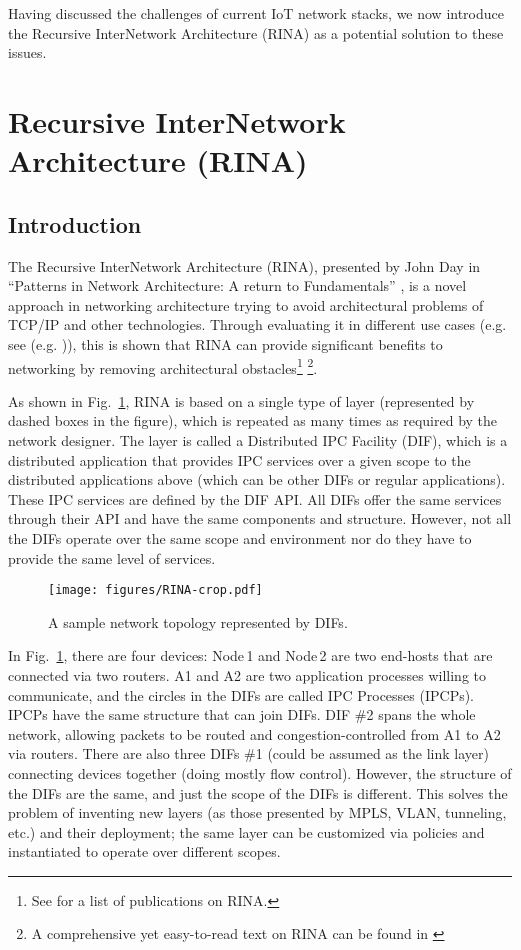 \documentclass{ieeeaccess}
\begin{document}
Having discussed the challenges of current IoT network stacks, we now introduce the Recursive InterNetwork Architecture (RINA) as a potential solution to these issues.


\section{Recursive InterNetwork Architecture (RINA)}
\label{sec:rina}
\subsection{Introduction}

The Recursive InterNetwork Architecture (RINA), presented by John Day in ``Patterns in Network Architecture: A return to Fundamentals'' \cite{Day:2008:PNA}, is a novel approach in networking architecture trying to avoid architectural problems of TCP/IP and other technologies. Through evaluating it in different use cases (e.g. see (e.g. \cite{peymanICC16,boddapati2012assessing,day2008networking,7510780,leon2016benefits,small2012})), this is shown that RINA can provide significant benefits to networking by removing architectural obstacles\footnote{See \cite{pouzinsociety} for a list of publications on RINA.} \footnote{A comprehensive yet easy-to-read text on RINA can be found in \cite{NGP2019}}. 


As shown in Fig.~\ref{fig:rina}, RINA is based on a single type of layer (represented by dashed boxes in the figure), which is repeated as many times as required by the network designer. The layer is called a Distributed IPC Facility (DIF), which is a distributed application that provides IPC services over a given scope to the distributed applications above (which can be other DIFs or regular applications). These IPC services are defined by the DIF API. All DIFs offer the  same services through their API and have the same components and structure. However, not all the DIFs operate over the same scope and environment nor do they have to provide the same level of services. 

\begin{figure}[!t]
	\centering
	\texttt{[image: figures/RINA-crop.pdf]}
	\caption{A sample network topology represented by DIFs.}
	\label{fig:rina}
\end{figure}

In Fig.~\ref{fig:rina}, there are four devices: Node\,1 and Node\,2 are two end-hosts that are connected via two routers. A1 and A2 are two application processes willing to communicate, and the circles in the DIFs are called IPC Processes (IPCPs). IPCPs have the same structure that can join DIFs. DIF \#2 spans the whole network, allowing packets to be routed and congestion-controlled from A1 to A2 via routers. There are also three DIFs \#1 (could be assumed as the link layer) connecting devices together (doing mostly flow control). However, the structure of the DIFs are the same, and just the scope of the DIFs is different. This solves the problem of inventing new layers (as those presented by MPLS, VLAN, tunneling, etc.) and their deployment; the same layer can be customized via policies and instantiated to operate over different scopes.
\end{document}
